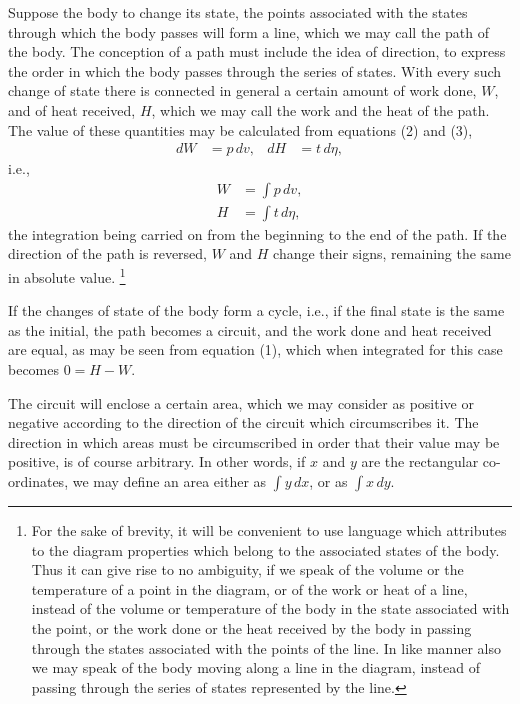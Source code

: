 \documentclass[11pt]{article}
\begin{document}
Suppose the body to change its state, the points associated with the states through which the body passes will form a line, which we may call the path of the body. The conception of a path must include the idea of direction, to express the order in which the body passes through the series of states. With every such change of state there is connected in general a certain amount of work done, $W$, and of heat received, $H$, which we may call the work and the heat of the path. The value of these quantities may be calculated from equations (2) and (3),
\begin{align*}
dW &= p\,dv, & dH &= t\,d\eta,
\end{align*}
i.e.,
\begin{align}
W &= \int p\,dv, \tag{5}\\
H &= \int t\,d\eta, \tag{6}
\end{align}
the integration being carried on from the beginning to the end of the path. If the direction of the path is reversed, $W$ and $H$ change their signs, remaining the same in absolute value.
\footnote{For the sake of brevity, it will be convenient to use language which attributes to the diagram properties which belong to the associated states of the body. Thus it can give rise to no ambiguity, if we speak of the volume or the temperature of a point in the diagram, or of the work or heat of a line, instead of the volume or temperature of the body in the state associated with the point, or the work done or the heat received by the body in passing through the states associated with the points of the line. In like manner also we may speak of the body moving along a line in the diagram, instead of passing through the series of states represented by the line.}

If the changes of state of the body form a cycle, i.e., if the final state is the same as the initial, the path becomes a circuit, and the work done and heat received are equal, as may be seen from equation (1), which when integrated for this case becomes $0=H-W$.

The circuit will enclose a certain area, which we may consider as positive or negative according to the direction of the circuit which circumscribes it. The direction in which areas must be circumscribed in order that their value may be positive, is of course arbitrary. In other words, if $x$ and $y$ are the rectangular co-ordinates, we may define an area either as $\int y\,dx$, or as $\int x\,dy$.
\end{document}
